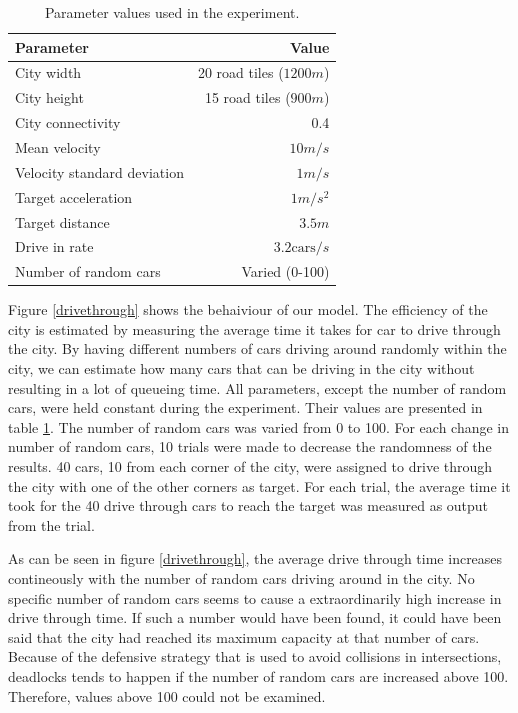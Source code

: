 \documentclass[11pt,a4paper]{article}
\begin{document}
\begin{table}[htb]
  \caption{Parameter values used in the experiment.}
  \label{params}
  \begin{center}
  \begin{tabular}{l | r}
  Parameter & Value \\
  \hline
  City width & 20 road tiles ($1200 m$) \\
  City height & 15 road tiles ($900 m$) \\
  City connectivity & 0.4 \\
  Mean velocity & $10 m/s$ \\
  Velocity standard deviation & $1 m/s$ \\
  Target acceleration &$ 1 m/s^2$\\
  Target distance & $3.5 m$\\
  Drive in rate & $3.2 \text{cars}/s$ \\
  Number of random cars & Varied (0-100) \\
  \end{tabular}
  \end{center}
\end{table}

Figure \ref{drivethrough} shows the behaiviour of our model. The 
efficiency of the city is estimated by measuring the average time it takes for car
to drive through the city. By having different numbers of cars driving around
randomly within the city, we can estimate how many cars that can be driving in
the city without resulting in a lot of queueing time. All parameters, except the
number of random cars, were held constant during the experiment. Their values
are presented in table \ref{params}. The number of random cars was varied from 0
to 100. For each change
in number of random cars, 10 trials were made to decrease the randomness of
the results. 40 cars, 10 from each corner of the city, were assigned to drive
through the city with one of the other corners as target. For each trial, the
average time it took for the 40 drive through cars to reach the target was
measured as output from the trial.

As can be seen in figure \ref{drivethrough}, the average drive through time
increases contineously with the number of random cars driving around in the
city. No specific number of random cars seems to cause a extraordinarily high
increase in drive through time. If such a number would have been found, it could
have been said that the city had reached its maximum capacity at that number of
cars. Because of the defensive strategy that is used to avoid collisions in
intersections, deadlocks tends to happen if the number of random cars are
increased above 100. Therefore, values above 100 could not be examined. 
\end{document}
